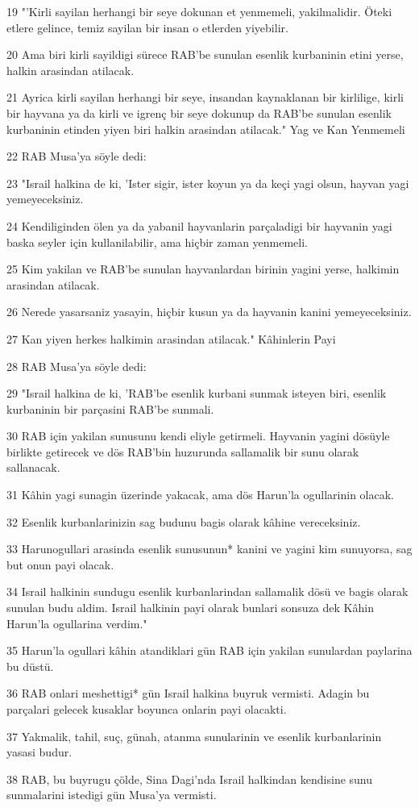 \par 19 "'Kirli sayilan herhangi bir seye dokunan et yenmemeli, yakilmalidir. Öteki etlere gelince, temiz sayilan bir insan o etlerden yiyebilir.
\par 20 Ama biri kirli sayildigi sürece RAB'be sunulan esenlik kurbaninin etini yerse, halkin arasindan atilacak.
\par 21 Ayrica kirli sayilan herhangi bir seye, insandan kaynaklanan bir kirlilige, kirli bir hayvana ya da kirli ve igrenç bir seye dokunup da RAB'be sunulan esenlik kurbaninin etinden yiyen biri halkin arasindan atilacak." Yag ve Kan Yenmemeli
\par 22 RAB Musa'ya söyle dedi:
\par 23 "Israil halkina de ki, 'Ister sigir, ister koyun ya da keçi yagi olsun, hayvan yagi yemeyeceksiniz.
\par 24 Kendiliginden ölen ya da yabanil hayvanlarin parçaladigi bir hayvanin yagi baska seyler için kullanilabilir, ama hiçbir zaman yenmemeli.
\par 25 Kim yakilan ve RAB'be sunulan hayvanlardan birinin yagini yerse, halkimin arasindan atilacak.
\par 26 Nerede yasarsaniz yasayin, hiçbir kusun ya da hayvanin kanini yemeyeceksiniz.
\par 27 Kan yiyen herkes halkimin arasindan atilacak." Kâhinlerin Payi
\par 28 RAB Musa'ya söyle dedi:
\par 29 "Israil halkina de ki, 'RAB'be esenlik kurbani sunmak isteyen biri, esenlik kurbaninin bir parçasini RAB'be sunmali.
\par 30 RAB için yakilan sunusunu kendi eliyle getirmeli. Hayvanin yagini dösüyle birlikte getirecek ve dös RAB'bin huzurunda sallamalik bir sunu olarak sallanacak.
\par 31 Kâhin yagi sunagin üzerinde yakacak, ama dös Harun'la ogullarinin olacak.
\par 32 Esenlik kurbanlarinizin sag budunu bagis olarak kâhine vereceksiniz.
\par 33 Harunogullari arasinda esenlik sunusunun* kanini ve yagini kim sunuyorsa, sag but onun payi olacak.
\par 34 Israil halkinin sundugu esenlik kurbanlarindan sallamalik dösü ve bagis olarak sunulan budu aldim. Israil halkinin payi olarak bunlari sonsuza dek Kâhin Harun'la ogullarina verdim."
\par 35 Harun'la ogullari kâhin atandiklari gün RAB için yakilan sunulardan paylarina bu düstü.
\par 36 RAB onlari meshettigi* gün Israil halkina buyruk vermisti. Adagin bu parçalari gelecek kusaklar boyunca onlarin payi olacakti.
\par 37 Yakmalik, tahil, suç, günah, atanma sunularinin ve esenlik kurbanlarinin yasasi budur.
\par 38 RAB, bu buyrugu çölde, Sina Dagi'nda Israil halkindan kendisine sunu sunmalarini istedigi gün Musa'ya vermisti.

